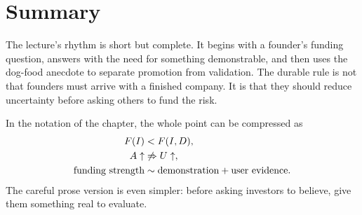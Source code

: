 \section{Summary}

The lecture's rhythm is short but complete. It begins with a founder's funding question, answers with the need for something demonstrable, and then uses the dog-food anecdote to separate promotion from validation. The durable rule is not that founders must arrive with a finished company. It is that they should reduce uncertainty before asking others to fund the risk.

In the notation of the chapter, the whole point can be compressed as
\begin{align}
F(I) &< F(I,D),
\\
A \uparrow &\not\Rightarrow U \uparrow,
\\
\hbox{funding strength}
&\sim
\hbox{demonstration}+\hbox{user evidence}.
\end{align}
The careful prose version is even simpler: before asking investors to believe, give them something real to evaluate.
